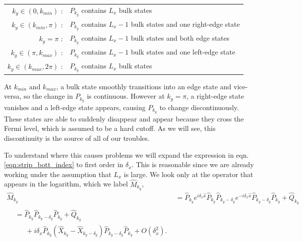 \begin{center}
\begin{tabular}{ r l }
 $k_y \in (0, k_{min})$ : & $P_{k_y}$ contains $L_x$ bulk states \\ 
 $k_y \in (k_{min},\pi)$ : & $P_{k_y}$ contains $L_x -1 $ bulk states and one right-edge state  \\  
  $k_y =\pi $ : & $P_{k_y}$ contains $L_x -1 $ bulk states and both edge states  \\  
 $k_y \in (\pi, k_{max})$ : & $P_{k_y}$ contains $L_x -1 $ bulk states and one left-edge state  \\ 
 $k_y \in ( k_{max} , 2\pi)$ : & $P_{k_y}$ contains $L_x$ bulk states
\end{tabular}
\end{center}
At $k_{min}$ and $k_{max}$, a bulk state smoothly transitions into an edge state and vice-versa, so the change in $P_{k_y}$ is continuous. However at $k_y = \pi$, a right-edge state vanishes and a left-edge state appears, causing $P_{k_y}$ to change discontinuously. These states are able to suddenly disappear and appear because they cross the Fermi level, which is assumed to be a hard cutoff. As we will see, this discontinuity is the source of all of our troubles.\par
To understand where this causes problems we will expand the expression in eqn. \ref{eqn:strip_bott_index} to first order in $\delta_x$. This is reasonable since we are already working under the assumption that $L_x$ is large. We look only at the operator that appears in the logarithm, which we label $\hat M_{k_y}$,
\begin{align}
	\hat M_{k_y} &= \hat P_{k_y}  e^{i \delta_x \hat x}  \hat P_{k_y} \hat P_{k_y - \delta_y} e^{-i \delta_x \hat x}  \hat P_{k_y - \delta_y} \hat P_{k_y} + \hat Q_{k_y} \\
	\begin{split}\label{eqn:m_taylor}
		& = \hat P_{k_y} \hat P_{k_y - \delta_y} \hat P_{k_y} + \hat Q_{k_y} \\
		&\phantom{=}\, + i \delta_x \hat P_{k_y} \left ( \hat X_{k_y} - \hat X_{k_y- \delta_y }  \right )\hat P_{k_y - \delta_y} \hat P_{k_y}
	+ O(\delta_x^2).
	\end{split}
\end{align}
